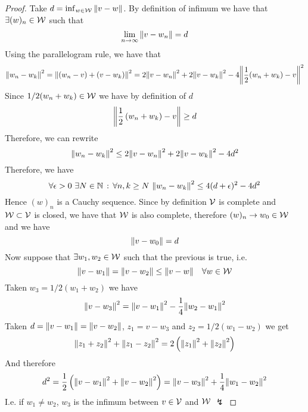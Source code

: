 \documentclass[../complete.tex]{subfiles}
\begin{document}
\begin{proof}
	Take $d=\inf_{w\in\mathcal{W}}\norm{v-w}$. By definition of infimum we have that $\exists(w)_n\in\mathcal{W}$ such that
	\begin{equation*}
		\lim_{n\to\infty}\norm{v-w_n}=d
	\end{equation*}
	Using the parallelogram rule, we have that
	\begin{equation*}
		\norm{w_n-w_k}^2=\norm{(w_n-v)+(v-w_k)}^2=2\norm{v-w_n}^2+2\norm{v-w_k}^2-4\norm{\frac{1}{2}(w_n+w_k)-v}^2
	\end{equation*}
	Since $1/2(w_n+w_k)\in\mathcal{W}$ we have by definition of $d$
	\begin{equation*}
		\norm{\frac{1}{2}\left( w_n+w_k \right)-v}\ge d
	\end{equation*}
	Therefore, we can rewrite
	\begin{equation*}
		\norm{w_n-w_k}^2\le2\norm{v-w_n}^2+2\norm{v-w_k}^2-4d^2
	\end{equation*}
	Therefore, we have
	\begin{equation*}
		\forall\epsilon>0\ \exists N\in\N\st\forall n,k\ge N\ \norm{w_n-w_k}^2\le4(d+\epsilon)^2-4d^2
	\end{equation*}
	Hence $(w)_n$ is a Cauchy sequence. Since by definition $\mathcal{V}$ is complete and $\mathcal{W}\subset\mathcal{V}$ is closed, we have that $\mathcal{W}$ is also complete, therefore $(w)_n\to w_0\in\mathcal{W}$ and we have
	\begin{equation*}
		\norm{v-w_0}=d
	\end{equation*}
	Now suppose that $\exists w_1,w_2\in\mathcal{W}$ such that the previous is true, i.e.
	\begin{equation*}
		\norm{v-w_1}=\norm{v-w_2}\le\norm{v-w}\quad\forall w\in\mathcal{W}
	\end{equation*}
	Taken $w_3=1/2(w_1+w_2)$ we have
	\begin{equation*}
		\norm{v-w_3}^2=\norm{v-w_1}^2-\frac{1}{4}\norm{w_2-w_1}^2
	\end{equation*}
	Taken $d=\norm{v-w_1}=\norm{v-w_2}$, $z_1=v-w_3$ and $z_2=1/2(w_1-w_2)$ we get
	\begin{equation*}
		\norm{z_1+z_2}^2+\norm{z_1-z_2}^2=2\left( \norm{z_1}^2+\norm{z_2}^2 \right)
	\end{equation*}
	And therefore
	\begin{equation*}
		d^2=\frac{1}{2}\left( \norm{v-w_1}^2+\norm{v-w_2}^2 \right)=\norm{v-w_3}^2+\frac{1}{4}\norm{w_1-w_2}^2
	\end{equation*}
	I.e. if $w_1\ne w_2$, $w_3$ is the infimum between $v\in\mathcal{V}$ and $\mathcal{W}$ $\lightning$
\end{proof}
\end{document}
